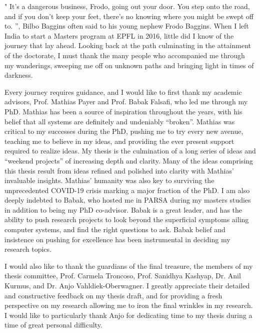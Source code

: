 "
It's a dangerous business, Frodo, going out your door. 
You step onto the road, and if you don't keep your feet, there's no knowing where you might be swept off to.
”, 
Bilbo Baggins often said to his young nephew Frodo Baggins. 
When I left India to start a Masters program at EPFL in 2016,
little did I know of the journey that lay ahead. 
Looking back at the path culminating in the attainment of the doctorate, 
I must thank the many people who accompanied me through my wanderings, 
sweeping me off on unknown paths
and bringing light  in times of darkness.

Every journey requires guidance, and I would like to first thank my academic advisors,
Prof. Mathias Payer and Prof. Babak Falsafi, who led me through my PhD.
Mathias has been a source of inspiration throughout the years,
with his belief that all systems are definitely and undeniably ``broken''.
Mathias was critical to my successes during the PhD, pushing me to try
every new avenue, teaching me to believe in my ideas, and providing the ever present
support required to realize ideas. 
My thesis is the culmination of a long series of ideas and ``weekend projects'' of 
increasing depth and clarity.
Many of the ideas comprising this thesis result from ideas refined and
polished into clarity with Mathias' invaluable insights.
Mathias' humanity was also key to surviving the unprecedented COVID-19 crisis
marking a major fraction of the PhD.
I am also deeply indebted to Babak, who hosted me in PARSA during my masters studies
in addition to being my PhD co-advisor. 
Babak is a great leader, and has the ability to push research projects to look beyond the
superficial symptoms ailing computer systems, and find the right questions to ask.
Babak belief and insistence on pushing for excellence has been instrumental in
deciding my research topics.

I would also like to thank the guardians of the final treasure, the members of my
thesis committee, Prof. Carmela Troncoso, Prof. Sanidhya Kashyap, Dr. Anil Kurmus, 
and Dr. Anjo Vahldiek-Oberwagner.
I greatly appreciate their detailed and constructive feedback on my thesis draft,
and for providing a fresh perspective on my research allowing me to iron the final 
wrinkles in my research.
I would like to particularly thank Anjo for dedicating time to my thesis during a
time of great personal difficulty.

